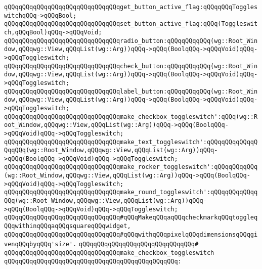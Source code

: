 \newline
\verb|qQQqqQQqqQQqqQQqqQQqqQQqqQQqqQQqget_button_active_flag:qQQqqQQqToggleswitchqQQq->qQQqBool;|\newline
\verb|qQQqqQQqqQQqqQQqqQQqqQQqqQQqqQQqset_button_active_flag:qQQq(Toggleswitch,qQQqBool)qQQq->qQQqVoid;|\newline
\newline
\verb|qQQqqQQqqQQqqQQqqQQqqQQqqQQqqQQqradio_button:qQQqqQQqqQQq(wg::Root_Window,qQQqwg::View,qQQqList(wg::Arg))qQQq->qQQq(BoolqQQq->qQQqVoid)qQQq->qQQqToggleswitch;|\newline
\verb|qQQqqQQqqQQqqQQqqQQqqQQqqQQqqQQqcheck_button:qQQqqQQqqQQq(wg::Root_Window,qQQqwg::View,qQQqList(wg::Arg))qQQq->qQQq(BoolqQQq->qQQqVoid)qQQq->qQQqToggleswitch;|\newline
\verb|qQQqqQQqqQQqqQQqqQQqqQQqqQQqqQQqlabel_button:qQQqqQQqqQQq(wg::Root_Window,qQQqwg::View,qQQqList(wg::Arg))qQQq->qQQq(BoolqQQq->qQQqVoid)qQQq->qQQqToggleswitch;|\newline
\newline
\verb|qQQqqQQqqQQqqQQqqQQqqQQqqQQqqQQqmake_checkbox_toggleswitch':qQQq(wg::Root_Window,qQQqwg::View,qQQqList(wg::Arg))qQQq->qQQq(BoolqQQq->qQQqVoid)qQQq->qQQqToggleswitch;|\newline
\verb|qQQqqQQqqQQqqQQqqQQqqQQqqQQqqQQqmake_text_toggleswitch':qQQqqQQqqQQqqQQqqQQq(wg::Root_Window,qQQqwg::View,qQQqList(wg::Arg))qQQq->qQQq(BoolqQQq->qQQqVoid)qQQq->qQQqToggleswitch;|\newline
\verb|qQQqqQQqqQQqqQQqqQQqqQQqqQQqqQQqmake_rocker_toggleswitch':qQQqqQQqqQQq(wg::Root_Window,qQQqwg::View,qQQqList(wg::Arg))qQQq->qQQq(BoolqQQq->qQQqVoid)qQQq->qQQqToggleswitch;|\newline
\verb|qQQqqQQqqQQqqQQqqQQqqQQqqQQqqQQqmake_round_toggleswitch':qQQqqQQqqQQqqQQq(wg::Root_Window,qQQqwg::View,qQQqList(wg::Arg))qQQq->qQQq(BoolqQQq->qQQqVoid)qQQq->qQQqToggleswitch;|\newline
\newline
\verb|qQQqqQQqqQQqqQQqqQQqqQQqqQQqqQQq#qQQqMakeqQQqaqQQqcheckmarkqQQqtoggleqQQqwithinqQQqaqQQqsquareqQQqwidget,|\newline
\verb|qQQqqQQqqQQqqQQqqQQqqQQqqQQqqQQq#qQQqwithqQQqpixelqQQqdimensionsqQQqgivenqQQqbyqQQq'size'.|\newline
\verb|qQQqqQQqqQQqqQQqqQQqqQQqqQQqqQQq#|\newline
\verb|qQQqqQQqqQQqqQQqqQQqqQQqqQQqqQQqmake_checkbox_toggleswitch|\newline
\verb|qQQqqQQqqQQqqQQqqQQqqQQqqQQqqQQqqQQqqQQqqQQqqQQq:|\newline
